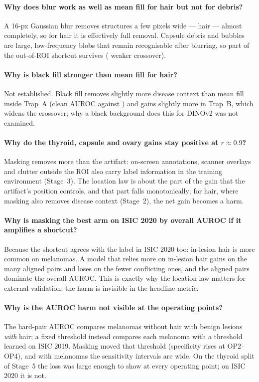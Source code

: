\paragraph{Why does blur work as well as mean fill for hair but not for debris?} A 16-px Gaussian blur removes structures
a few pixels wide --- hair --- almost completely, so for hair it is effectively full removal. Capsule debris and bubbles
are large, low-frequency blobs that remain recognisable after blurring, so part of the out-of-ROI shortcut survives
(\sSevenCcapsulemaskblur{} weaker crossover).
\paragraph{Why is black fill stronger than mean fill for hair?} Not established. Black fill removes slightly more disease
context than mean fill inside Trap~A (clean AUROC \sSevenDisicmaskblacktrapAclean{} against \sSevenDisicmasktrapAclean{}) and
gains slightly more in Trap~B, which widens the crossover; why a black background does this for DINOv2 was not examined.
\paragraph{Why do the thyroid, capsule and ovary gains stay positive at $r\approx0.9$?} Masking removes more than the
artifact: on-screen annotations, scanner overlays and clutter outside the ROI also carry label information in the
training environment (Stage~3). The location law is about the part of the gain that the artifact's position controls, and
that part falls monotonically; for hair, where masking also removes disease context (Stage~2), the net gain becomes a harm.
\paragraph{Why is masking the best arm on ISIC 2020 by overall AUROC if it amplifies a shortcut?} Because the shortcut
agrees with the label in ISIC 2020 too: in-lesion hair is more common on melanomas. A model that relies more on in-lesion
hair gains on the many aligned pairs and loses on the fewer conflicting ones, and the aligned pairs dominate the overall
AUROC. This is exactly why the location law matters for external validation: the harm is invisible in the headline metric.
\paragraph{Why is the AUROC harm not visible at the operating points?} The hard-pair AUROC compares melanomas without hair
with benign lesions \emph{with} hair; a fixed threshold instead compares each melanoma with a threshold learned on ISIC
2019. Masking moved that threshold (specificity rises at OP2--OP4), and with \sSevenTestMelanomas{} melanomas the
sensitivity intervals are wide. On the thyroid split of Stage~5 the loss was large enough to show at every operating point;
on ISIC 2020 it is not.
